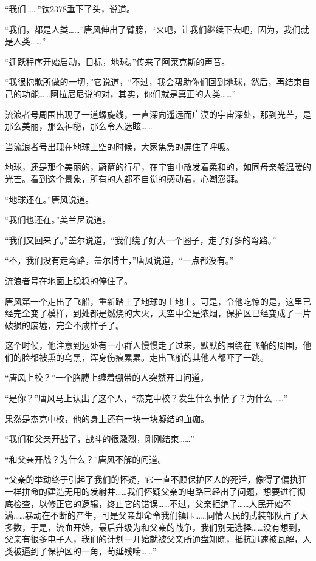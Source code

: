 “我们……”钛2378垂下了头，说道。 

“我们，都是人类……”唐风伸出了臂膀，“来吧，让我们继续下去吧，因为，我们就是人类……” 

“迁跃程序开始启动，目标，地球。”传来了阿莱克斯的声音。 

“我很抱歉所做的一切，”它说道，“不过，我会帮助你们回到地球，然后，再结束自己的功能……阿拉尼尼说的对，其实，你们就是真正的人类……” 

流浪者号周围出现了一道螺旋线，一直深向遥远而广漠的宇宙深处，那到光芒，是那么美丽，那么神秘，那么令人迷眩…… 

当流浪者号出现在地球上空的时候，大家焦急的屏住了呼吸。 

地球，还是那个美丽的，蔚蓝的行星，在宇宙中散发着柔和的，如同母亲般温暖的光芒。看到这个景象，所有的人都不自觉的感动着，心潮澎湃。 

“地球还在。”唐风说道。 

“我们也还在。”美兰尼说道。 

“我们又回来了。”盖尔说道，“我们绕了好大一个圈子，走了好多的弯路。” 

“不，我们没有走弯路，盖尔博士，”唐风说道，“一点都没有。” 

流浪者号在地面上稳稳的停住了。 

唐风第一个走出了飞船，重新踏上了地球的土地上。可是，令他吃惊的是，这里已经完全变了模样，到处都是燃烧的大火，天空中全是浓烟，保护区已经变成了一片破损的废墟，完全不成样子了。 

这个时候，他注意到远处有一小群人慢慢走了过来，默默的围绕在飞船的周围，他们的脸都被熏的乌黑，浑身伤痕累累。走出飞船的其他人都吓了一跳。 

“唐风上校？”一个胳膊上缠着绷带的人突然开口问道。 

“是你？”唐风马上认出了这个人，“杰克中校？发生什么事情了？为什么……” 

果然是杰克中校，他的身上还有一块一块凝结的血痂。 

“我们和父亲开战了，战斗的很激烈，刚刚结束……” 

“和父亲开战？为什么？”唐风不解的问道。 

“父亲的举动终于引起了我们的怀疑，它一直不顾保护区人的死活，像得了偏执狂一样拼命的建造无用的发射井……我们怀疑父亲的电路已经出了问题，想要进行彻底检查，以修正它的逻辑，终止它的错误……不过，父亲拒绝了……人民开始不满……暴动在不断的产生，可是父亲却命令我们镇压……同情人民的武装部队占了大多数，于是，流血开始，最后升级为和父亲的战争，我们别无选择……没有想到，父亲有很多电子人，我们的计划一开始就被父亲所通盘知晓，抵抗迅速被瓦解，人类被逼到了保护区的一角，苟延残喘……” 

